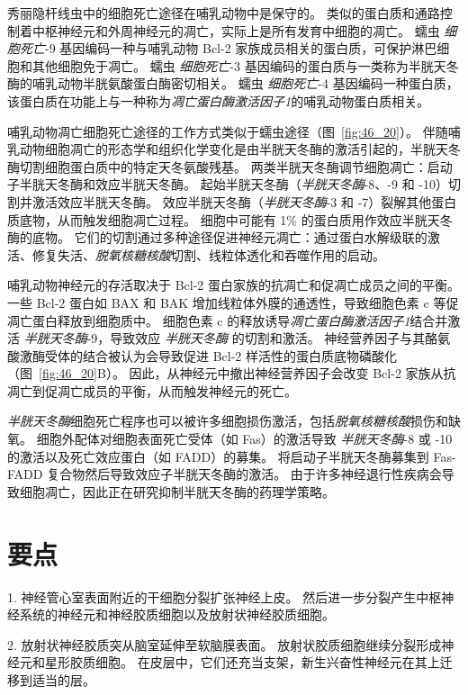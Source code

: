 秀丽隐杆线虫中的细胞死亡途径在哺乳动物中是保守的。
类似的蛋白质和通路控制着中枢神经元和外周神经元的凋亡，实际上是所有发育中细胞的凋亡。
蠕虫 \textit{细胞死亡}-9 基因编码一种与哺乳动物 Bcl-2 家族成员相关的蛋白质，可保护淋巴细胞和其他细胞免于凋亡。
蠕虫 \textit{细胞死亡}-3 基因编码的蛋白质与一类称为半胱天冬酶的哺乳动物半胱氨酸蛋白酶密切相关。
蠕虫 \textit{细胞死亡}-4 基因编码一种蛋白质，该蛋白质在功能上与一种称为\textit{凋亡蛋白酶激活因子1}的哺乳动物蛋白质相关。


哺乳动物凋亡细胞死亡途径的工作方式类似于蠕虫途径（图~\ref{fig:46_20}）。
伴随哺乳动物细胞凋亡的形态学和组织化学变化是由半胱天冬酶的激活引起的，半胱天冬酶切割细胞蛋白质中的特定天冬氨酸残基。
两类半胱天冬酶调节细胞凋亡：启动子半胱天冬酶和效应半胱天冬酶。 起始半胱天冬酶（\textit{半胱天冬酶}-8、-9 和 -10）切割并激活效应半胱天冬酶。
效应半胱天冬酶（\textit{半胱天冬酶}-3 和 -7）裂解其他蛋白质底物，从而触发细胞凋亡过程。
细胞中可能有 1\% 的蛋白质用作效应半胱天冬酶的底物。
它们的切割通过多种途径促进神经元凋亡：通过蛋白水解级联的激活、修复失活、\textit{脱氧核糖核酸}切割、线粒体透化和吞噬作用的启动。


哺乳动物神经元的存活取决于 Bcl-2 蛋白家族的抗凋亡和促凋亡成员之间的平衡。
一些 Bcl-2 蛋白如 BAX 和 BAK 增加线粒体外膜的通透性，导致细胞色素 c 等促凋亡蛋白释放到细胞质中。
细胞色素 c 的释放诱导\textit{凋亡蛋白酶激活因子1}结合并激活 \textit{半胱天冬酶}-9，导致效应 \textit{半胱天冬酶} 的切割和激活。
神经营养因子与其酪氨酸激酶受体的结合被认为会导致促进 Bcl-2 样活性的蛋白质底物磷酸化（图~\ref{fig:46_20}B）。
因此，从神经元中撤出神经营养因子会改变 Bcl-2 家族从抗凋亡到促凋亡成员的平衡，从而触发神经元的死亡。


\textit{半胱天冬酶}细胞死亡程序也可以被许多细胞损伤激活，包括\textit{脱氧核糖核酸}损伤和缺氧。
细胞外配体对细胞表面死亡受体（如 Fas）的激活导致 \textit{半胱天冬酶}-8 或 -10 的激活以及死亡效应蛋白（如 FADD）的募集。
将启动子半胱天冬酶募集到 Fas-FADD 复合物然后导致效应子半胱天冬酶的激活。
由于许多神经退行性疾病会导致细胞凋亡，因此正在研究抑制半胱天冬酶的药理学策略。



\section{要点}

1. 神经管心室表面附近的干细胞分裂扩张神经上皮。
然后进一步分裂产生中枢神经系统的神经元和神经胶质细胞以及放射状神经胶质细胞。


2. 放射状神经胶质突从脑室延伸至软脑膜表面。
放射状胶质细胞继续分裂形成神经元和星形胶质细胞。
在皮层中，它们还充当支架，新生兴奋性神经元在其上迁移到适当的层。


